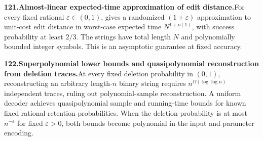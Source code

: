 \documentclass[11pt,a4paper]{article}
\begin{document}
  \par \begin{minipage}{\linewidth}
  \fontsize{10.5}{12.6}\selectfont\RaggedRight
  \hypertarget{result 121}{}
  {\bfseries\textcolor{muted}{121.}\enspace Almost-linear expected-time approximation of edit distance.}\enspace For every fixed rational $\varepsilon\in(0,1)$, gives a randomized $(1+\varepsilon)$ approximation to unit-cost edit distance in worst-case expected time $N^{1+o(1)}$, with success probability at least $2/3$. The strings have total length $N$ and polynomially bounded integer symbols. This is an asymptotic guarantee at fixed accuracy.\par
  \end{minipage}\par\vspace{5pt}



  \par \begin{minipage}{\linewidth}
  \fontsize{10.5}{12.6}\selectfont\RaggedRight
  \hypertarget{result 122}{}
  {\bfseries\textcolor{muted}{122.}\enspace Superpolynomial lower bounds and quasipolynomial reconstruction from deletion traces.}\enspace At every fixed deletion probability in $(0,1)$, reconstructing an arbitrary length-$n$ binary string requires $n^{\Omega(\log\log n)}$ independent traces, ruling out polynomial-sample reconstruction. A uniform decoder achieves quasipolynomial sample and running-time bounds for known fixed rational retention probabilities. When the deletion probability is at most $n^{-\varepsilon}$ for fixed $\varepsilon>0$, both bounds become polynomial in the input and parameter encoding.\par
  \end{minipage}\par\vspace{5pt}
\end{document}
